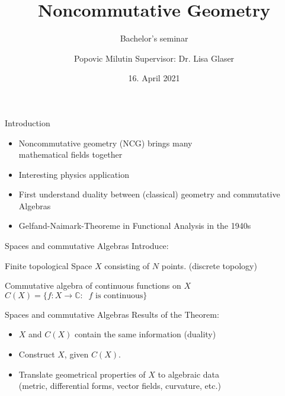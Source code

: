 \documentclass[fleqn]{beamer}
\title
{Noncommutative Geometry}
\subtitle{Bachelor's seminar}
\author[Popovic Milutin]
{Popovic Milutin \newline Supervisor: Dr. Lisa Glaser}
\date{16. April 2021}
\begin{document}
    \begin{frame}
        \titlepage
    \end{frame}

    \begin{frame}{Introduction}
        \begin{itemize}
            \item Noncommutative geometry (NCG) brings many\\
                  mathematical fields together
            \item Interesting physics application
            \item First understand duality between (classical) geometry and commutative Algebras
            \item Gelfand-Naimark-Theoreme in Functional Analysis in the 1940s
        \end{itemize}
    \end{frame}

    \begin{frame}{Spaces and commutative Algebras}
        Introduce:
        \begin{block}
            {Finite topological Space $X$ consisting of $N$ points. (discrete topology)}
            \begin{figure}[h!]
            \centering
            \end{figure}

        \end{block}
        \begin{block}{Commutative algebra of continuous functions on $X$}
            \centering
             $C(X) = \{ f: X \rightarrow \mathbb{C}:\;\;
             \text{$f$ is continuous}\}$
        \end{block}
    \end{frame}
    \begin{frame}
        {Spaces and commutative Algebras}
        Results of the Theorem:
            \begin{itemize}
                \item $X$ and $C(X)$ contain the same information (duality)
                \item Construct $X$, given $C(X)$.
                \item Translate geometrical properties of $X$ to algebraic data\\
                    (metric, differential forms, vector fields, curvature, etc.)
            \end{itemize}
    \end{frame}
\end{document}

